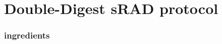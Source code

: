 
\graphicspath{
    {/Users/Claudius/Documents/PhD/THESIS/kks32/LaTeX/Appendix1/}
    }

\chapter{Double-Digest sRAD protocol}

\subsection{ingredients}

